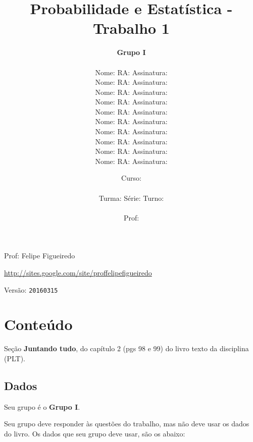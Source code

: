 \documentclass[a4paper]{article}
\date{
\bigskip
Curso: \underline{\hspace{8cm}}\\
\ \\
Turma: \underline{\hspace{1cm}} Série: \underline{\hspace{1cm}} Turno:
\underline{\hspace{1cm}}\\
\ \\
Prof: \underline{\hspace{8cm}}\\
}
\title{Probabilidade e Estatística - Trabalho 1}
\author{
{\bf Grupo I}\\
\ \\
Nome: \underline{\hspace{6cm}} RA: \underline{\hspace{2cm}} Assinatura: \underline{\hspace{4cm}}\\
Nome: \underline{\hspace{6cm}} RA: \underline{\hspace{2cm}} Assinatura: \underline{\hspace{4cm}}\\
Nome: \underline{\hspace{6cm}} RA: \underline{\hspace{2cm}} Assinatura: \underline{\hspace{4cm}}\\
Nome: \underline{\hspace{6cm}} RA: \underline{\hspace{2cm}} Assinatura: \underline{\hspace{4cm}}\\
Nome: \underline{\hspace{6cm}} RA: \underline{\hspace{2cm}} Assinatura: \underline{\hspace{4cm}}\\
Nome: \underline{\hspace{6cm}} RA: \underline{\hspace{2cm}} Assinatura: \underline{\hspace{4cm}}\\
Nome: \underline{\hspace{6cm}} RA: \underline{\hspace{2cm}} Assinatura: \underline{\hspace{4cm}}\\
Nome: \underline{\hspace{6cm}} RA: \underline{\hspace{2cm}} Assinatura: \underline{\hspace{4cm}}\\
Nome: \underline{\hspace{6cm}} RA: \underline{\hspace{2cm}} Assinatura: \underline{\hspace{4cm}}\\
Nome: \underline{\hspace{6cm}} RA: \underline{\hspace{2cm}} Assinatura: \underline{\hspace{4cm}}\\
}
\begin{document}
\maketitle
\newpage

\parbox[c]{.825\textwidth}{\raggedright%
{Prof: Felipe Figueiredo\par}
{\url{http://sites.google.com/site/proffelipefigueiredo}\par}
}

Versão: \verb|20160315|




\section{Conteúdo}

Seção {\bf Juntando tudo}, do capítulo 2 (pgs 98 e 99) do livro texto da disciplina (PLT). 

\subsection{Dados}
Seu grupo é o {\bf Grupo I}.

Seu grupo deve responder às questões do trabalho, mas não deve usar os dados do livro. Os dados que seu grupo deve usar, são os abaixo:
\end{document}
